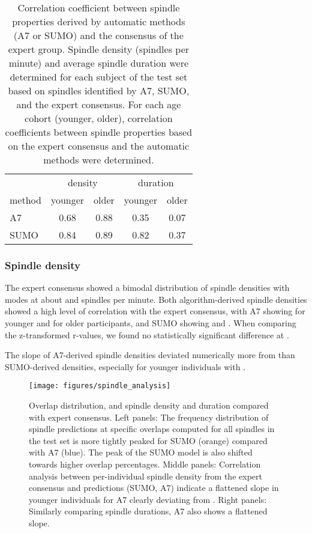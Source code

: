 \documentclass[fleqn,twocolumn,10pt]{wlscirep}
\begin{document}
\begin{table}[t]
	\centering
	\begin{tabular}{@{}lcccc@{}}
		\toprule
		& \multicolumn{2}{c}{density} & \multicolumn{2}{c}{duration} \\
		\cmidrule(l){2-3} \cmidrule(l){4-5}
		method & younger & older & younger & older \\
		\midrule
		A7\cite{Lacourse2019} & 0.68 & 0.88 & 0.35 & 0.07 \\
		SUMO & 0.84 & 0.89 & 0.82 & 0.37 \\
		\bottomrule
	\end{tabular}
	\caption{
		Correlation coefficient  between spindle properties derived by
		automatic methods (A7 or SUMO) and the consensus of the expert group.
		Spindle density (spindles per minute) and average spindle
		duration were determined for each subject of the test set based on
		spindles identified by A7, SUMO, and the expert consensus. For each age
		cohort (younger, older), correlation coefficients between spindle
		properties based on the expert consensus and the automatic methods
		were determined.
	}
	\label{tab:moda-correlation}
\end{table}

\subsubsection{Spindle density}

The expert consensus showed a bimodal distribution of spindle densities with
modes at about  and  spindles per minute.
Both algorithm-derived spindle densities showed a high level of correlation with
the expert consensus, with A7 showing  for younger and  for
older participants, and SUMO showing   and .
When comparing the z-transformed r-values, we found no statistically significant
difference at .

The slope of A7-derived spindle densities deviated numerically more from  than
SUMO-derived densities, especially for younger individuals with .

\begin{figure*}[t]
	\centering
	\texttt{[image: figures/spindle\_analysis]}
	\caption{
		Overlap distribution, and spindle density and duration compared
		with expert consensus.  Left panels: The frequency distribution
		of spindle predictions at specific overlaps computed for all
		spindles in the test set is more tightly peaked for SUMO
		(orange) compared with A7 (blue).  The peak of the SUMO model is
		also shifted towards higher overlap percentages.  Middle
		panels: Correlation analysis between per-individual spindle
		density from the expert consensus and predictions (SUMO, A7)
		indicate a flattened slope in younger individuals for A7
		clearly deviating from .  Right panels: Similarly comparing
                spindle durations, A7 also shows a flattened slope.
	}
	\label{fig:spindle-analysis}
\end{figure*}
\end{document}
